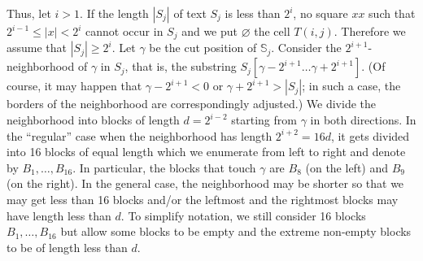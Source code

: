 \documentclass[11pt]{article}
\theoremstyle{break}
\newcommand{\slp}[1]{\mathbb{#1}}
\newcommand{\substr}[2]{[#1\dots#2]}
\begin{document}
Thus, let $i>1$. If the length $|S_j|$ of text $S_j$ is less than $2^i$, no square $xx$ such that $2^{i-1}\le|x|<2^i$ cannot occur in $S_j$
and we put $\varnothing$ the cell $T(i,j)$. Therefore we assume that $|S_j|\ge 2^i$. Let $\gamma$ be the cut position of $\slp{S}_j$.
Consider the $2^{i+1}$-neighborhood of $\gamma$ in $S_j$, that is, the substring $S_j\substr{\gamma-2^{i+1}}{\gamma+2^{i+1}}$. (Of course,
it may happen that $\gamma-2^{i+1}<0$ or $\gamma+2^{i+1}>|S_j|$; in such a case, the borders of the neighborhood are correspondingly
adjusted.) We divide the neighborhood into blocks of length $d=2^{i-2}$ starting from $\gamma$ in both directions. In the ``regular'' case
when the neighborhood has length $2^{i+2}=16d$, it gets divided into 16 blocks of equal length which we enumerate from left to right and
denote by $B_1,\dots,B_{16}$. In particular, the blocks that touch $\gamma$ are $B_8$ (on the left) and $B_9$ (on the right). In the
general case, the neighborhood may be shorter so that we may get less than 16 blocks and/or the leftmost and the rightmost blocks may have
length less than $d$. To simplify notation, we still consider 16 blocks $B_1,\dots,B_{16}$ but allow some blocks to be empty and the
extreme non-empty blocks to be of length less than $d$.
\end{document}

